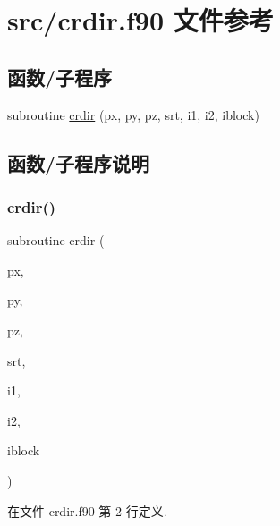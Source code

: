 \hypertarget{crdir_8f90}{}\section{src/crdir.f90 文件参考}
\label{crdir_8f90}
\subsection*{函数/子程序}
\begin{DoxyCompactItemize}
\item 
subroutine \mbox{\hyperlink{crdir_8f90_a04a2637bb6d4fd8ed0884f717085ebd6}{crdir}} (px, py, pz, srt, i1, i2, iblock)
\end{DoxyCompactItemize}


\subsection{函数/子程序说明}
\mbox{\label{crdir_8f90_a04a2637bb6d4fd8ed0884f717085ebd6}} 
\subsubsection{\texorpdfstring{crdir()}{crdir()}}
{\footnotesize\ttfamily subroutine crdir (\begin{DoxyParamCaption}\item[{}]{px,  }\item[{}]{py,  }\item[{}]{pz,  }\item[{}]{srt,  }\item[{}]{i1,  }\item[{}]{i2,  }\item[{}]{iblock }\end{DoxyParamCaption})}



在文件 crdir.\+f90 第 2 行定义.

